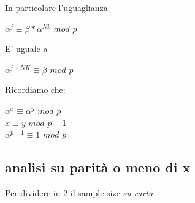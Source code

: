 \documentclass[11pt, oneside]{article}   	%
\begin{document}
In particolare l'uguaglianza
\begin{center}
$\alpha^j \equiv \beta * \alpha^{Nk}$ $mod$ $p$
\end{center}
E' uguale a 
\begin{center}
$\alpha^{j+NK} \equiv \beta$ $mod$ $p$
\end{center}
Ricordiamo che:
\begin{center}
$\alpha^x \equiv \alpha^y$ $mod$ $p$\\
$x \equiv y$ $mod$ $p-1$\\
$\alpha^{p-1}\equiv 1$ $mod$ $p$
\end{center}

\subsection*{analisi su parità o meno di x}
Per dividere in 2 il sample size
\emph{su carta}
\end{document}
